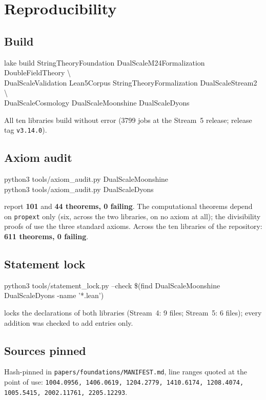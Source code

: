 \documentclass[11pt,a4paper]{article}
\theoremstyle{remark}
\begin{document}
\appendix
\section{Reproducibility}
\label{app:repro}

\subsection{Build}
\begin{center}
\footnotesize\ttfamily
lake build StringTheoryFoundation DualScaleM24Formalization DoubleFieldTheory \textbackslash\\
  DualScaleValidation Lean5Corpus StringTheoryFormalization DualScaleStream2 \textbackslash\\
  DualScaleCosmology DualScaleMoonshine DualScaleDyons
\end{center}
All ten libraries build without error (3799 jobs at the Stream~5 release; release tag \texttt{v3.14.0}).

\subsection{Axiom audit}
\begin{center}
\footnotesize\ttfamily
python3 tools/axiom\_audit.py DualScaleMoonshine\\
python3 tools/axiom\_audit.py DualScaleDyons
\end{center}
report \textbf{101} and \textbf{44 theorems, 0 failing}. The computational theorems depend on
\texttt{propext} only (six, across the two libraries, on no axiom at all); the divisibility proofs of  use the three standard
axioms. Across the ten libraries of the repository: \textbf{611 theorems, 0 failing}.

\subsection{Statement lock}
\begin{center}
\footnotesize\ttfamily
python3 tools/statement\_lock.py --check \$(find DualScaleMoonshine DualScaleDyons -name '*.lean')
\end{center}
locks the declarations of both libraries (Stream~4: 9 files; Stream~5: 6 files); every addition was
checked to add entries only.

\subsection{Sources pinned}
Hash-pinned in \texttt{papers/foundations/MANIFEST.md}, line ranges quoted at the point of use:
{\small\texttt{1004.0956, 1406.0619, 1204.2779, 1410.6174, 1208.4074, 1005.5415, 2002.11761,
2205.12293}}.
\end{document}
